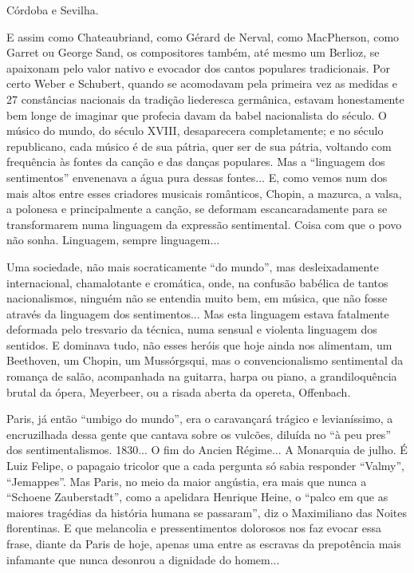 Córdoba e Sevilha.

E assim como Chateaubriand, como Gérard de Nerval, como MacPherson, como
Garret ou George Sand, os compositores também, até mesmo um Berlioz, se
apaixonam pelo valor nativo e evocador dos cantos populares
tradicionais. Por certo Weber e Schubert, quando se acomodavam pela
primeira vez as medidas e 27 constâncias nacionais da tradição
liederesca germânica, estavam honestamente bem longe de imaginar que
profecia davam da babel nacionalista do século. O músico do mundo, do
século XVIII, desaparecera completamente; e no século republicano, cada
músico é de sua pátria, quer ser de sua pátria, voltando com frequência
às fontes da canção e das danças populares. Mas a ``linguagem dos
sentimentos'' envenenava a água pura dessas fontes... E, como vemos num
dos mais altos entre esses criadores musicais românticos, Chopin, a
mazurca, a valsa, a polonesa e principalmente a canção, se deformam
escancaradamente para se transformarem numa linguagem da expressão
sentimental. Coisa com que o povo não sonha. Linguagem, sempre
linguagem...

Uma sociedade, não mais socraticamente ``do mundo'', mas desleixadamente
internacional, chamalotante e cromática, onde, na confusão babélica de
tantos nacionalismos, ninguém não se entendia muito bem, em música, que
não fosse através da linguagem dos sentimentos... Mas esta linguagem
estava fatalmente deformada pelo tresvario da técnica, numa sensual e
violenta linguagem dos sentidos. E dominava tudo, não esses heróis que
hoje ainda nos alimentam, um Beethoven, um Chopin, um Mussórgsqui, mas o
convencionalismo sentimental da romança de salão, acompanhada na
guitarra, harpa ou piano, a grandiloquência brutal da ópera, Meyerbeer,
ou a risada aberta da opereta, Offenbach.

Paris, já então ``umbigo do mundo'', era o caravançará trágico e
levianíssimo, a encruzilhada dessa gente que cantava sobre os vulcões,
diluída no ``à peu pres'' dos sentimentalismos. 1830... O fim do Ancien
Régime... A Monarquia de julho. É Luiz Felipe, o papagaio tricolor que a
cada pergunta só sabia responder ``Valmy'', ``Jemappes''. Mas Paris, no
meio da maior angústia, era mais que nunca a ``Schoene Zauberstadt'',
como a apelidara Henrique Heine, o ``palco em que as maiores tragédias
da história humana se passaram'', diz o Maximiliano das Noites
florentinas. E que melancolia e pressentimentos dolorosos nos faz evocar
essa frase, diante da Paris de hoje, apenas uma entre as escravas da
prepotência mais infamante que nunca desonrou a dignidade do homem...

